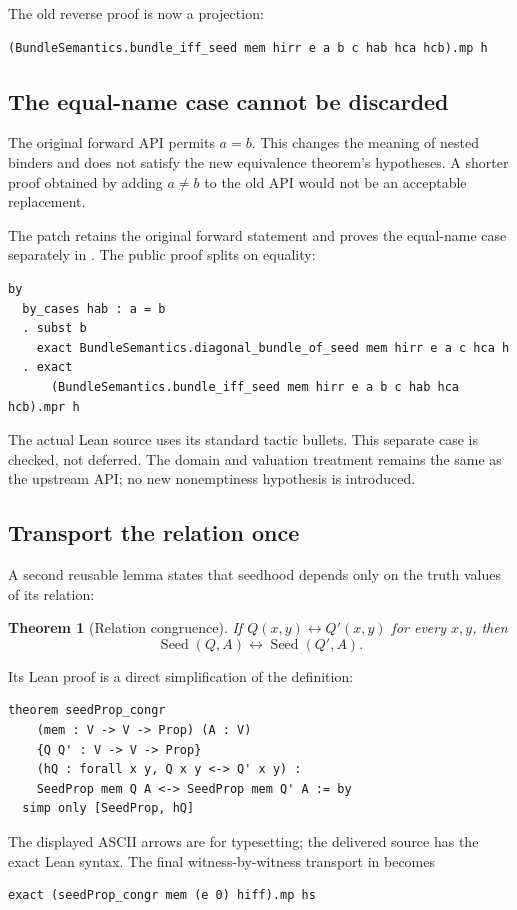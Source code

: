 \documentclass[11pt]{article}
\newtheorem{theorem}{Theorem}[section]
\newcommand{\Seed}{\operatorname{Seed}}
\newcommand{\code}[1]{\texttt{\detokenize{#1}}}
\begin{document}
The old reverse proof is now a projection:
\begin{lstlisting}
(BundleSemantics.bundle_iff_seed mem hirr e a b c hab hca hcb).mp h
\end{lstlisting}

\subsection{The equal-name case cannot be discarded}

The original forward API permits $a=b$. This changes the meaning of nested binders and does not satisfy the new equivalence theorem's hypotheses. A shorter proof obtained by adding $a\ne b$ to the old API would not be an acceptable replacement.

The patch retains the original forward statement and proves the equal-name case separately in \code{diagonal_bundle_of_seed}. The public proof splits on equality:
\begin{lstlisting}
by
  by_cases hab : a = b
  . subst b
    exact BundleSemantics.diagonal_bundle_of_seed mem hirr e a c hca h
  . exact
      (BundleSemantics.bundle_iff_seed mem hirr e a b c hab hca hcb).mpr h
\end{lstlisting}
The actual Lean source uses its standard tactic bullets. This separate case is checked, not deferred. The domain and valuation treatment remains the same as the upstream API; no new nonemptiness hypothesis is introduced.

\subsection{Transport the relation once}

A second reusable lemma states that seedhood depends only on the truth values of its relation:
\begin{theorem}[Relation congruence]
If $Q(x,y)\leftrightarrow Q'(x,y)$ for every $x,y$, then
\[
 \Seed(Q,A)\leftrightarrow\Seed(Q',A).
\]
\end{theorem}
Its Lean proof is a direct simplification of the definition:
\begin{lstlisting}
theorem seedProp_congr
    (mem : V -> V -> Prop) (A : V)
    {Q Q' : V -> V -> Prop}
    (hQ : forall x y, Q x y <-> Q' x y) :
    SeedProp mem Q A <-> SeedProp mem Q' A := by
  simp only [SeedProp, hQ]
\end{lstlisting}
The displayed ASCII arrows are for typesetting; the delivered source has the exact Lean syntax. The final witness-by-witness transport in \code{seed_eqFree} becomes
\begin{lstlisting}
exact (seedProp_congr mem (e 0) hiff).mp hs
\end{lstlisting}
\end{document}
